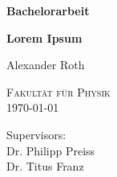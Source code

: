 \begin{titlepage}
    \centering
    
    \begin{minipage}{0.5\textwidth}
    \end{minipage}
    \hfill
    \begin{minipage}{0.3\textwidth}
    \end{minipage}

    
    \vspace{2cm}

    {\Large \bfseries Bachelorarbeit}

    \vspace{0.5cm}
    
    {\huge\bfseries Lorem Ipsum\\[0.4cm]}
    
    \vspace{1.5cm}
    
    {\Large Alexander Roth}
    
    
    \vfill
    

    \vfill
    \textsc{Fakultät für Physik}\\
    \vspace{1cm}
    {\Large \today}
    \vfill

    \Large Supervisors: \\Dr. Philipp Preiss \\Dr. Titus Franz
    
\end{titlepage}